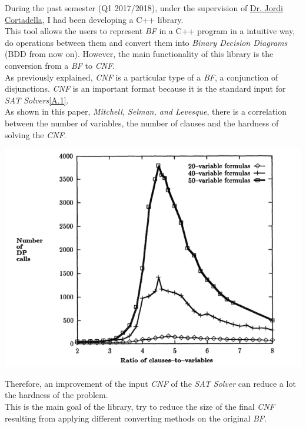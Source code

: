 During the past semester (Q1 2017/2018), under the supervision of \href{https://www.cs.upc.edu/~jordicf/}{Dr. Jordi Cortadella}, I had been developing a C++ library.\\
This tool allows the users to represent \emph{BF} in a C++ program in a intuitive way, do operations between them and convert them into \emph{Binary Decision Diagrams} (BDD from now on). However, the main functionality of this library is the conversion from a \emph{BF} to \emph{CNF}.  \\
As previously explained, \emph{CNF} is a particular type of a \emph{BF}, a conjunction of disjunctions. \emph{CNF} is an important format because it is the standard input for \emph{SAT Solvers}\ref{A.1}.\\
As shown in this paper, \emph{Mitchell, Selman, and Levesque\cite{Mitchell}}, there is a correlation between the number of variables, the number of clauses and the hardness of solving the \emph{CNF}.
\begin{center}
	\includegraphics[width=1\textwidth]{Figures/GraphMitchellSelmanLevesque.png}
\end{center}
Therefore, an improvement of the input \emph{CNF} of the \emph{SAT Solver} can reduce a lot the hardness of the problem. \\
This is the main goal of the library, try to reduce the size of the final \emph{CNF} resulting from applying different converting methods on the original \emph{BF}.

